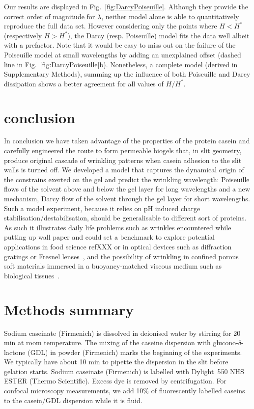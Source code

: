 \documentclass[twocolumn,superscriptaddress,showpacs,preprintnumbers,
amsmath,amssymb,prl]{revtex4-1}
\begin{document}
Our results are displayed in Fig.~\ref{fig:DarcyPoiseuille}. Although they provide the correct order of magnitude for $\lambda$, neither model alone is able to quantitatively reproduce the full data set. However considering only the points where $H<H^*$ (respectively $H>H^*$), the Darcy (resp. Poiseuille) model fits the data well albeit with a prefactor. Note that it would be easy to miss out on the failure of the Poiseuille model at small wavelengths by adding an unexplained offset (dashed line in Fig.~\ref{fig:DarcyPoiseuille}b). Nonetheless, a complete model (derived in Supplementary Methods), summing up the influence of both Poiseuille and Darcy dissipation shows a better agreement for all values of $H/H^*$.

\section*{conclusion}

In conclusion we have taken advantage of the properties of the protein casein and carefully engineered the route to form permeable biogels that, in slit geometry, produce original cascade of wrinkling patterns when casein adhesion to the slit walls is turned off. We developed a model that captures the dynamical origin of the constrains exerted on the gel and predict the wrinkling wavelength: Poiseuille flows of the solvent above and below the gel layer for long wavelengths and a new mechanism, Darcy flow of the solvent through the gel layer for short wavelengths. Such a model experiment, because it relies on pH induced charge stabilisation/destabilisation, should be generalisable to different sort of proteins. As such it illustrates daily life problems such as wrinkles encountered while putting up wall paper and could set a benchmark to explore potential applications in food science refXXX or in optical devices such as diffraction gratings or Fresnel lenses~\cite{Chan2006a,Li2013}, and the possibility of wrinkling in confined porous soft materials immersed in a buoyancy-matched viscous medium such as biological tissues~\cite{Ma2004,Longley2013}.



\section*{Methods summary}

Sodium caseinate (Firmenich)  is dissolved in deionised water by stirring for 20 min  at room temperature.  The mixing of the caseine dispersion with glucono-$\delta$-lactone (GDL) in powder (Firmenich) marks the beginning of the experiments. We typically have about 10 min to pipette the dispersion in the slit before gelation starts. Sodium caseinate (Firmenich) is labelled with Dylight~550 NHS ESTER (Thermo Scientific). Excess dye is removed by centrifugation. For confocal microscopy measurements, we add 10\% of fluorescently labelled caseins to the casein/GDL dispersion while it is fluid.
\end{document}
